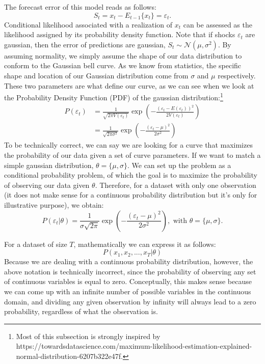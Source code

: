 \documentclass[a4paper,12pt]{article}%
\begin{document}
The forecast error of this model reads as follows:%
\[
S_{t}=x_{t}-E_{t-1}\{x_{t}\}=\varepsilon_{t}.
\]
Conditional likelihood associated with a realization of $x_{t}$ can be
assessed as the likelihood assigned by its probability density function. Note
that if shocks $\varepsilon_{t}$ are gaussian, then the error of predictions
are gaussian, $S_{t}\sim\mathcal{N}(\mu,\sigma^{2})$. By assuming normality,
we simply assume the shape of our data distribution to conform to the Gaussian
bell curve. As we know from statistics, the specific shape and location of our
Gaussian distribution come from $\sigma$ and $\mu$ respectively. These two
parameters are what define our curve, as we can see when we look at the
Probability Density Function (PDF) of the gaussian distribution:\footnote{Most
of this subsection is strongly inspired by
https://towardsdatascience.com/maximum-likelihood-estimation-explained-normal-distribution-6207b322e47f.}%
\begin{align*}
P\left(  \varepsilon_{t}\right)   &  =\frac{1}{\sqrt{2\pi V\left(
\varepsilon_{t}\right)  }}\exp\left(  -\frac{\left(  \varepsilon_{t}-E\left(
\varepsilon_{t}\right)  \right)  ^{2}}{2V\left(  \varepsilon_{t}\right)
}\right) \\
&  =\frac{1}{\sqrt{2\pi\sigma^{2}}}\exp\left(  -\frac{\left(  \varepsilon
_{t}-\mu\right)  ^{2}}{2\sigma^{2}}\right)
\end{align*}
To be technically correct, we can say we are looking for a curve that
maximizes the probability of our data given a set of curve parameters. If we
want to match a simple gaussian distribution, $\theta=\{\mu,\sigma\}$. We can
set up the problem as a conditional probability problem, of which the goal is
to maximize the probability of observing our data given $\theta$. Therefore,
for a dataset with only one observation (it does not make sense for a
continuous probability distribution but it's only for illustrative purpose),
we obtain:
\begin{equation}
P\left(  \varepsilon_{t}|\theta\right)  =\frac{1}{\sigma\sqrt{2\pi}}%
\exp\left(  -\frac{\left(  \varepsilon_{t}-\mu\right)  ^{2}}{2\sigma^{2}%
}\right)  ,\text{ with }\theta=\{\mu,\sigma\}.
\end{equation}


For a dataset of size $T$, mathematically we can express it as follows:%
\begin{equation}
P\left(  x_{1},x_{2},...,x_{T}|\theta\right)
\end{equation}
Because we are dealing with a continuous probability distribution, however,
the above notation is technically incorrect, since the probability of
observing any set of continuous variables is equal to zero. Conceptually, this
makes sense because we can come up with an infinite number of possible
variables in the continuous domain, and dividing any given observation by
infinity will always lead to a zero probability, regardless of what the
observation is.
\end{document}
